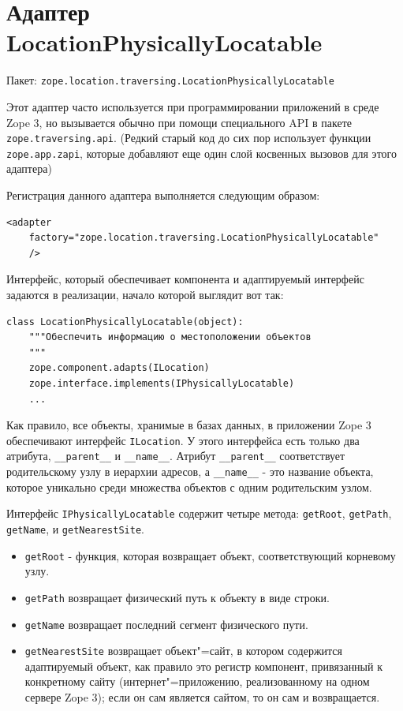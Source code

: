 \documentclass[a4paper,openany,twoside,draft]{book}
\begin{document}
\section{Адаптер LocationPhysicallyLocatable%
  \label{locationphysicallylocatable}%
}

Пакет: \texttt{zope.location.traversing.LocationPhysicallyLocatable}

Этот адаптер часто используется при программировании приложений в среде Zope 3, но вызывается обычно при помощи специального API в пакете \texttt{zope.traversing.api}.  (Редкий старый код до сих пор использует функции \texttt{zope.app.zapi}, которые добавляют еще один слой косвенных вызовов для этого адаптера)

Регистрация данного адаптера выполняется следующим образом:

\begin{verbatim}
<adapter
    factory="zope.location.traversing.LocationPhysicallyLocatable"
    />
\end{verbatim}

Интерфейс, который обеспечивает компонента и адаптируемый интерфейс задаются в реализации, начало которой выглядит вот так:

\begin{verbatim}
class LocationPhysicallyLocatable(object):
    """Обеспечить информацию о местоположении объектов
    """
    zope.component.adapts(ILocation)
    zope.interface.implements(IPhysicallyLocatable)
    ...
\end{verbatim}

Как правило, все объекты, хранимые в базах данных, в приложении Zope 3 обеспечивают интерфейс \texttt{ILocation}.  У этого интерфейса есть только два атрибута, \texttt{\_\_parent\_\_} и \texttt{\_\_name\_\_}.  Атрибут \texttt{\_\_parent\_\_} соответствует родительскому узлу в иерархии адресов, а \texttt{\_\_name\_\_} - это название объекта, которое уникально среди множества объектов с одним родительским узлом.

Интерфейс \texttt{IPhysicallyLocatable} содержит четыре метода: \texttt{getRoot}, \texttt{getPath}, \texttt{getName}, и \texttt{getNearestSite}.

\begin{itemize}

\item \texttt{getRoot} - функция, которая возвращает объект, соответствующий корневому узлу.

\item \texttt{getPath} возвращает физический путь к объекту в виде строки.

\item \texttt{getName} возвращает последний сегмент физического пути.

\item \texttt{getNearestSite} возвращает объект"=сайт, в котором содержится адаптируемый объект, как правило это регистр компонент, привязанный к конкретному сайту (интернет"=приложению, реализованному на одном сервере Zope 3); если он сам является сайтом, то он сам и возвращается.

\end{itemize}
\end{document}
